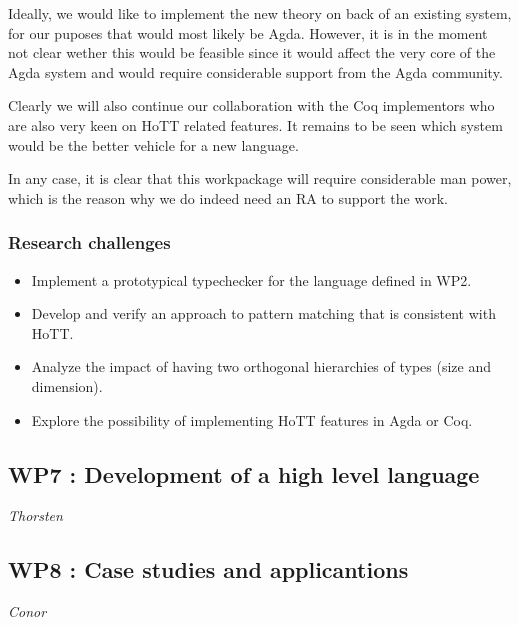 \documentclass[twocolumn,a4paper,11pt]{article}
\begin{document}
Ideally, we would like to implement the new theory on back of an
existing system, for our puposes that would most likely be Agda. 
However, it is in the moment not clear wether this would be feasible
since it would affect the very core of the Agda system and would
require considerable support from the Agda community.

Clearly we will also continue our collaboration with the Coq
implementors who are also very keen on HoTT related features. It
remains to be seen which system would be the better vehicle for a new
language.

In any case, it is clear that this workpackage will require
considerable man power, which is the reason why we do indeed need an
RA to support the work. 

\subsubsection*{Research challenges}

\begin{itemize}

\item Implement a prototypical typechecker for the language defined in
  WP2. 

\item Develop and verify an approach to pattern matching that is
  consistent with HoTT.

\item Analyze the impact of having two orthogonal hierarchies of types
  (size and dimension).

\item Explore the possibility of implementing HoTT features in Agda or
  Coq.
  
\end{itemize}

\subsection*{WP7 : Development of a high level language} 

\emph{Thorsten}

\subsection*{WP8 : Case studies and applicantions} 

\emph{Conor}


\end{document}
